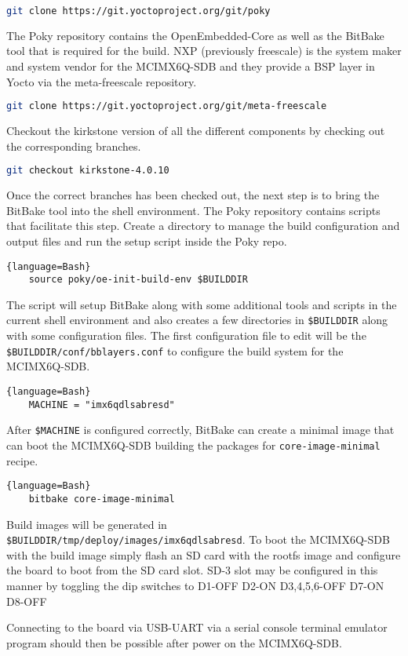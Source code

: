 \begin{lstlisting}[language=Bash]
	git clone https://git.yoctoproject.org/git/poky
\end{lstlisting}

The Poky repository contains the OpenEmbedded-Core as well as the BitBake tool that is required for the build. NXP (previously freescale) is the system maker and system vendor for the MCIMX6Q-SDB and they provide a BSP layer in Yocto via the meta-freescale repository.

\begin{lstlisting}[language=Bash]
	git clone https://git.yoctoproject.org/git/meta-freescale
\end{lstlisting}

Checkout the kirkstone version of all the different components by checking out the corresponding branches.

\begin{lstlisting}[language=Bash]
	git checkout kirkstone-4.0.10
\end{lstlisting}

Once the correct branches has been checked out, the next step is to bring the BitBake tool into the shell environment. The Poky repository contains scripts that facilitate this step. Create a directory to manage the build configuration and output files and run the setup script inside the Poky repo.

\begin{lstlisting}{language=Bash}
	source poky/oe-init-build-env $BUILDDIR
\end{lstlisting}

The script will setup BitBake along with some additional tools and scripts in the current shell environment and also creates a few directories in \texttt{\$BUILDDIR} along with some configuration files. The first configuration file to edit will be the \texttt{\$BUILDDIR/conf/bblayers.conf} to configure the build system for the MCIMX6Q-SDB.

\begin{lstlisting}{language=Bash}
	MACHINE = "imx6qdlsabresd"
\end{lstlisting}

After \texttt{\$MACHINE} is configured correctly, BitBake can create a minimal image that can boot the MCIMX6Q-SDB building the packages for \texttt{core-image-minimal} recipe.

\begin{lstlisting}{language=Bash}
	bitbake core-image-minimal
\end{lstlisting}

Build images will be generated in \texttt{\$BUILDDIR/tmp/deploy/images/imx6qdlsabresd}. To boot the MCIMX6Q-SDB with the build image simply flash an SD card with the rootfs image and configure the board to boot from the SD card slot. SD-3 slot may be configured in this manner by toggling the dip switches to D1-OFF D2-ON D3,4,5,6-OFF D7-ON D8-OFF

Connecting to the board via USB-UART via a serial console terminal emulator program should then be possible after power on the MCIMX6Q-SDB.
